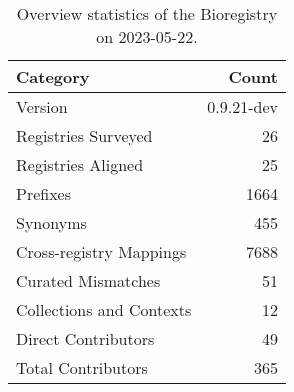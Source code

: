 \begin{table}
\caption{Overview statistics of the Bioregistry on 2023-05-22.}
\label{tab:bioregistry-summary}
\begin{tabular}{lr}
\toprule
Category & Count \\
\midrule
Version & 0.9.21-dev \\
Registries Surveyed & 26 \\
Registries Aligned & 25 \\
Prefixes & 1664 \\
Synonyms & 455 \\
Cross-registry Mappings & 7688 \\
Curated Mismatches & 51 \\
Collections and Contexts & 12 \\
Direct Contributors & 49 \\
Total Contributors & 365 \\
\bottomrule
\end{tabular}
\end{table}
